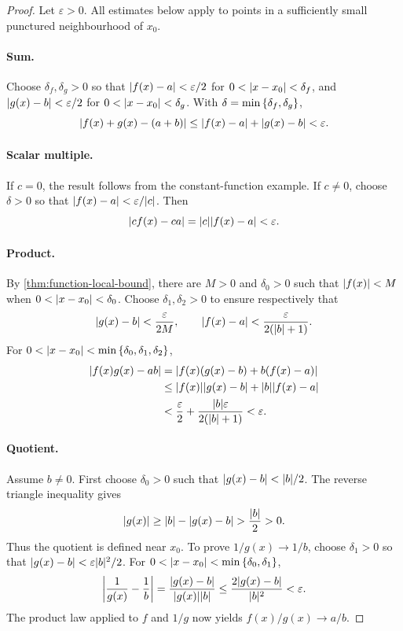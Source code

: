 \documentclass[11pt,a4paper]{amsart}
\begin{document}
\begin{proof}
  Let \(\varepsilon>0\). All estimates below apply to points in
  a sufficiently small punctured neighbourhood of \(x_0\).

  \paragraph{Sum.}
  Choose \(\delta_f,\delta_g>0\) so that
  \(\abs{f(x)-a}<\varepsilon/2\) for
  \(0<\abs{x-x_0}<\delta_f\), and
  \(\abs{g(x)-b}<\varepsilon/2\) for
  \(0<\abs{x-x_0}<\delta_g\). With
  \(\delta=\min\set{\delta_f,\delta_g}\),
  \[
    \abs{f(x)+g(x)-(a+b)}
    \leq\abs{f(x)-a}+\abs{g(x)-b}<\varepsilon.
  \]

  \paragraph{Scalar multiple.}
  If \(c=0\), the result follows from the constant-function example.
  If \(c\neq0\), choose \(\delta>0\) so that
  \(\abs{f(x)-a}<\varepsilon/\abs{c}\). Then
  \[
    \abs{cf(x)-ca}=\abs{c}\abs{f(x)-a}<\varepsilon.
  \]

  \paragraph{Product.}
  By \cref{thm:function-local-bound}, there are \(M>0\) and
  \(\delta_0>0\) such that \(\abs{f(x)}<M\) when
  \(0<\abs{x-x_0}<\delta_0\). Choose \(\delta_1,\delta_2>0\)
  to ensure respectively that
  \[
    \abs{g(x)-b}<\frac{\varepsilon}{2M},
    \qquad
    \abs{f(x)-a}<\frac{\varepsilon}{2(\abs{b}+1)}.
  \]
  For \(0<\abs{x-x_0}<\min\set{\delta_0,\delta_1,\delta_2}\),
  \begin{align*}
    \abs{f(x)g(x)-ab}
    &=\abs{f(x)(g(x)-b)+b(f(x)-a)}\\
    &\leq\abs{f(x)}\abs{g(x)-b}+\abs{b}\abs{f(x)-a}\\
    &<\frac\varepsilon2+
    \frac{\abs{b}\varepsilon}{2(\abs{b}+1)}<\varepsilon.
  \end{align*}

  \paragraph{Quotient.}
  Assume \(b\neq0\). First choose \(\delta_0>0\) such that
  \(\abs{g(x)-b}<\abs{b}/2\). The reverse triangle inequality gives
  \[
    \abs{g(x)}\geq\abs{b}-\abs{g(x)-b}>\frac{\abs{b}}2>0.
  \]
  Thus the quotient is defined near \(x_0\). To prove
  \(1/g(x)\to1/b\), choose \(\delta_1>0\) so that
  \(\abs{g(x)-b}<\varepsilon\abs{b}^2/2\). For
  \(0<\abs{x-x_0}<\min\set{\delta_0,\delta_1}\),
  \[
    \abs*{\frac1{g(x)}-\frac1b}
    =\frac{\abs{g(x)-b}}{\abs{g(x)}\abs{b}}
    \leq\frac{2\abs{g(x)-b}}{\abs{b}^2}<\varepsilon.
  \]
  The product law applied to \(f\) and \(1/g\) now yields
  \(f(x)/g(x)\to a/b\).
\end{proof}
\end{document}
